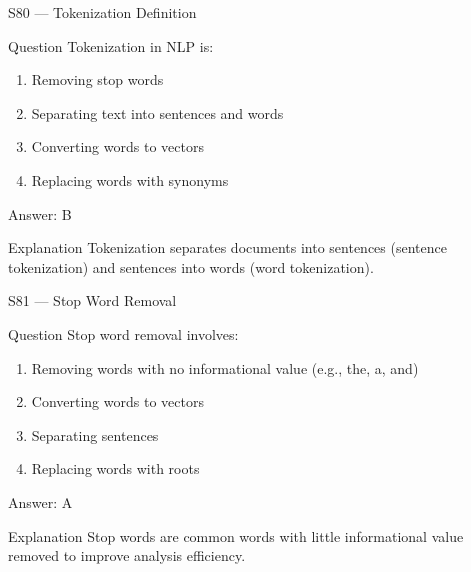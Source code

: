 \documentclass[aspectratio=169,8pt]{beamer}
\begin{document}
	\begin{frame}{S80 --- Tokenization Definition}
		\begin{block}{Question}
			Tokenization in NLP is:
			\begin{enumerate}
				\item Removing stop words
				\item Separating text into sentences and words
				\item Converting words to vectors
				\item Replacing words with synonyms
			\end{enumerate}
		\end{block}
		\begin{exampleblock}{Answer: B}\end{exampleblock}
		\begin{block}{Explanation}
			Tokenization separates documents into sentences (sentence tokenization) and sentences into words (word tokenization).
		\end{block}
	\end{frame}
	
	\begin{frame}{S81 --- Stop Word Removal}
		\begin{block}{Question}
			Stop word removal involves:
			\begin{enumerate}
				\item Removing words with no informational value (e.g., the, a, and)
				\item Converting words to vectors
				\item Separating sentences
				\item Replacing words with roots
			\end{enumerate}
		\end{block}
		\begin{exampleblock}{Answer: A}\end{exampleblock}
		\begin{block}{Explanation}
			Stop words are common words with little informational value removed to improve analysis efficiency.
		\end{block}
	\end{frame}
	
\end{document}
